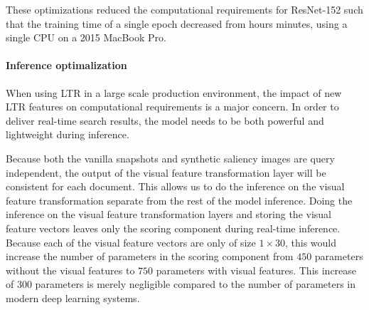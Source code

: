 These optimizations reduced the computational requirements for ResNet-152 such that the training time of a single epoch decreased from hours minutes, using a single CPU on a 2015 MacBook Pro. 

\paragraph{Inference optimalization}
When using \ac{LTR} in a large scale production environment, the impact of new \ac{LTR} features on computational requirements is a major concern. 
In order to deliver real-time search results, the model needs to be both powerful and lightweight during inference. 

Because both the vanilla snapshots and synthetic saliency images are query independent, the output of the visual feature transformation layer will be consistent for each document. This allows us to do the inference on the visual feature transformation separate from the rest of the model inference. Doing the inference on the visual feature transformation layers and storing the visual feature vectors leaves only the scoring component during real-time inference. Because each of the visual feature vectors are only of size $1\times30$, this would increase the number of parameters in the scoring component from $450$ parameters without the visual features to $750$ parameters with visual features. This increase of $300$ parameters is merely negligible compared to the number of parameters in modern deep learning systems. 





